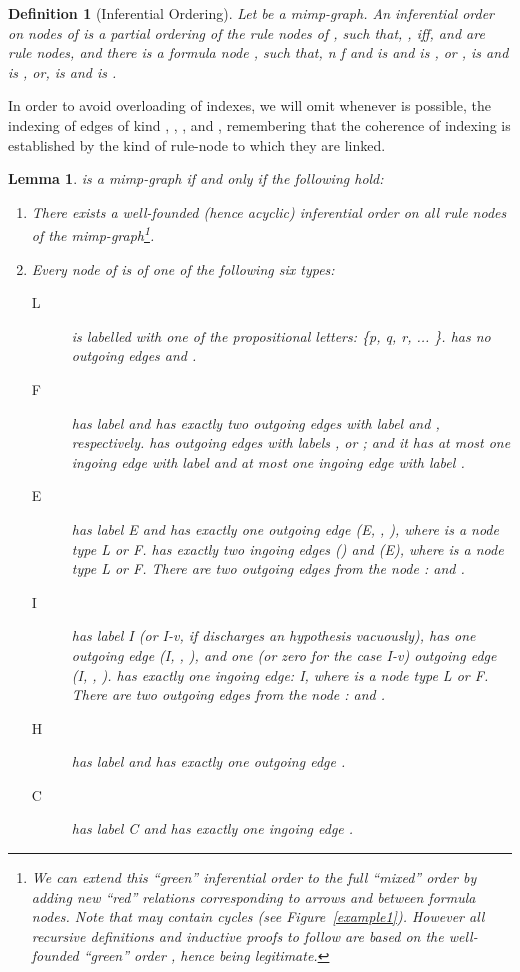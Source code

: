 \documentclass[submission,copyright,creativecommons]{eptcs}
\newtheorem{definition}{Definition}
\newtheorem{lemma}{Lemma}
\begin{document}
\begin{definition}[Inferential Ordering]
Let  be a mimp-graph. An inferential order  on nodes of  is a partial
ordering of the rule nodes of , such that, , iff,  and  are rule nodes, and there is a formula node , such that, n  f  and  is  and  is , or ,  is  and  is , or,  is  and 
is .
\end{definition} 

In order to avoid overloading of indexes, we will omit whenever is possible, 
the indexing of edges of kind , , ,  and , remembering that 
the coherence of indexing is established by the kind of rule-node to which they 
are linked.

\begin{lemma}
 is a mimp-graph if and only if the following hold: \label{lem-PG}

\begin{enumerate}
\item  There exists a well-founded (hence acyclic) inferential order  on
all rule nodes of the mimp-graph\footnote{We can extend this ``green'' inferential order  to the full ``mixed''
order  by adding new ``red'' relations  corresponding to arrows  and  between formula nodes. Note that 
may contain cycles (see Figure~\ref{example1}). However all recursive
definitions and inductive proofs to follow are based on the well-founded
``green'' order , hence being legitimate.}.


\item  Every node  of  is of one of the following six types:

\begin{description}
\item[L \ \ \ ]   is labelled with one of the propositional letters: \{p,
q, r, ... \}.  has no outgoing edges  and .

\item[F \ \ \ ]   has label  and has exactly two outgoing edges
with label  and , respectively.  has outgoing edges with labels , 
 or ; and it has at most one ingoing edge with label  and at
most one ingoing edge with label .

\item[E \ \ \ ]   has label E and has exactly one outgoing edge 
(E, , ), where  is a node type \emph{L} or 
\emph{F}.  has exactly two ingoing edges () and 
(E), where  is a node type \emph{L} or \emph{F}.
There are two outgoing edges from the node : 
and .

\item[I \ \ \ ]   has label I (or  I-v, if discharges an hypothesis vacuously), has one outgoing edge (I, , ), and one (or zero for the case I-v) outgoing edge (I, , ). 
 has exactly one ingoing edge: I, where 
is a node type \emph{L} or \emph{F}. There are two outgoing edges from the
node :  and .

\item[H \ \ \ ]   has label \emph{} and has exactly one outgoing
edge .

\item[C \ \ \ ]   has label \emph{C} and has exactly one ingoing edge .
\end{description}
\end{enumerate}
\end{lemma}
\end{document}
